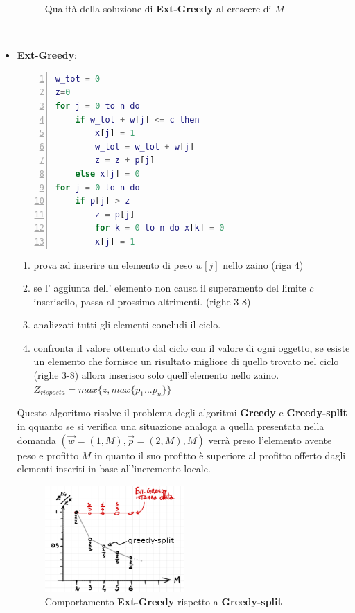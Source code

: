 \documentclass[a4paper]{article}
\begin{document}
\begin{itemize}
\begin{figure}[!ht]
\caption{Qualità della soluzione di \textbf{Ext-Greedy} al crescere di $M$} \label{FIG:C_9_greedy}
\end{figure}\\
\item \textbf{Ext-Greedy}:
		\begin{lstlisting}[numbers=left,firstnumber=1,language=Matlab, stepnumber=1, xleftmargin=50pt]
w_tot = 0
z=0
for j = 0 to n do
	if w_tot + w[j] <= c then
		x[j] = 1
		w_tot = w_tot + w[j]
		z = z + p[j]
	else x[j] = 0
for j = 0 to n do
	if p[j] > z
		z = p[j]
		for k = 0 to n do x[k] = 0
		x[j] = 1
		\end{lstlisting}
		\begin{enumerate}
			\item prova ad inserire un elemento di peso $w[j]$ nello zaino (riga 4)
			\item se l' aggiunta dell' elemento non causa il superamento del limite $c$ inseriscilo, passa al prossimo altrimenti. (righe 3-8)
			\item analizzati tutti gli elementi concludi il ciclo.
			\item confronta il valore ottenuto dal ciclo con il valore di ogni oggetto, se esiste un elemento che fornisce un risultato migliore di quello trovato nel ciclo (righe 3-8) allora inserisco solo quell'elemento nello zaino. $Z_{risposta} = max\{z, max\{p_1 ... p_n\}\}$
		\end{enumerate}
		Questo algoritmo risolve il problema degli algoritmi \textbf{Greedy} e \textbf{Greedy-split} in qquanto se si verifica una situazione analoga a quella presentata nella domanda $(\vec w = (1,M), \vec p = (2,M), M)$ verrà preso l'elemento avente peso e profitto $M$ in quanto il suo profitto è superiore al profitto offerto dagli elementi inseriti in base all'incremento locale.
\begin{figure}[!ht]
\centering
\includegraphics[width=0.5\textwidth]{./img/C_9_ext.png}
\caption{Comportamento \textbf{Ext-Greedy} rispetto a \textbf{Greedy-split}} \label{FIG:C_9_ext}
\end{figure}\\
\end{itemize}
\end{document}
